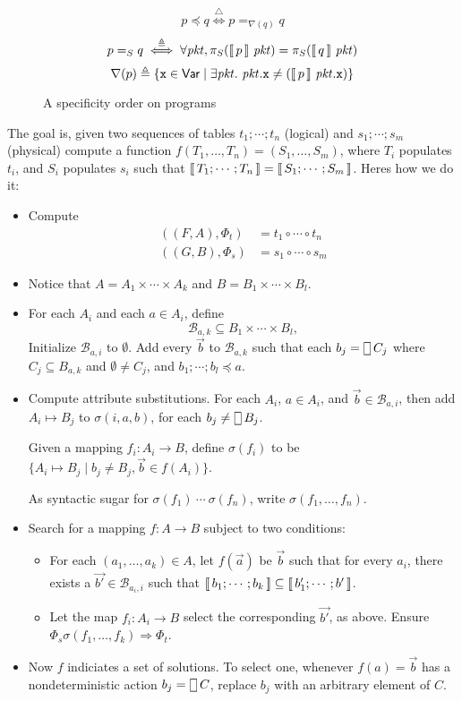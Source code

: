 \begin{figure}[tpbh]
  \[
    p \preceq q \overset{\triangle}{\iff}
    p =_{\nabla(q)} q 
  \]
  \[p =_{S} q \overset\triangleq\iff \forall \mathit{pkt}, \pi_S(\llbracket\,p\,\rrbracket~\mathit{pkt}) = \pi_S(\llbracket\,q\,\rrbracket~\mathit{pkt})\]
  \[\nabla(p) \triangleq \{\texttt x \in
    \mathsf{Var} \mid \exists \mathit{pkt}.~\mathit{pkt}.\texttt x \neq
    (\llbracket\,p\,\rrbracket~\mathit{pkt}.\texttt x) \}\]
  \caption{A specificity order on programs}
  \label{fig:order}
\end{figure}

The goal is, given two sequences of tables $t_1;\cdots;t_n$ (logical)
and $s_1;\cdots;s_m$ (physical) compute a function
$f(T_1,\ldots,T_n) = (S_1,\ldots,S_m)$, where $T_i$ populates $t_i$,
and $S_i$ populates $s_i$ such that
$\llbracket\,T_1;\cdots;T_n\,\rrbracket = \llbracket\,S_1;\cdots;S_m\,\rrbracket$. Heres how we do
it:
\begin{itemize}
\item Compute
  \begin{align*}
    ((F,A),\Phi_t) &= t_1 \circ \cdots \circ t_n\\
    ((G,B),\Phi_s) &= s_1 \circ \cdots \circ s_m
  \end{align*}
\item Notice that $A = A_1\times \cdots \times A_k $ and
  $B = B_1 \times \cdots \times B_l$.

\item For each $A_i$ and each $a \in A_i$, define
  \[\mathcal B_{a,k} \subseteq B_{1}\times \cdots \times B_{l},\]
  Initialize $\mathcal B_{a,i}$ to $\emptyset$. Add every $\vec b$ to
  $\mathcal B_{a,k}$ such that each $b_j = \Angel C_j$ where
  $C_j \subseteq B_{a,k}$ and $\emptyset \neq C_j$, and
  $b_1; \cdots ; b_l \preceq a$.

\item Compute attribute substitutions. For each $A_i$, $a \in A_i$,
  and $\vec b \in \mathcal B_{a,i}$, then add $A_i \mapsto B_j$ to
  $\sigma(i,a,b)$, for each $b_j \neq \Angel B_j$.

  Given a mapping $f_i: A_i \to B$, define $\sigma(f_i)$ to be
  $\{A_i \mapsto B_j \mid b_j \neq B_j, \vec b \in f(A_i)\}$.

  As syntactic sugar for $\sigma(f_1)~\cdots~\sigma(f_n)$, write
  $\sigma(f_1, \ldots, f_n)$.

\item Search for a mapping $f: A \to B$ subject to two conditions:
  \begin{itemize}
  \item For each $(a_1,\ldots, a_k) \in A$, let $f(\vec a)$ be
    $\vec{b}$ such that for every $a_i$, there exists a
    $\vec{b'} \in \mathcal B_{a_i,i}$ such that
    $\llbracket\,b_1;\cdots;b_k\,\rrbracket \subseteq \llbracket\,b'_1;\cdots;b'\,\rrbracket$. 
  \item Let the map $f_i : A_i \to B$ select the corresponding
    $\vec{b'}$, as above. Ensure
    $\Phi_s\sigma(f_1,\ldots,f_k) \Rightarrow \Phi_t$.
  \end{itemize}

\item Now $f$ indiciates a set of solutions. To select one, whenever
  $f(a) = \vec b$ has a nondeterministic action $b_j = \Angel C$,
  replace $b_j$ with an arbitrary element of $C$.

\end{itemize}